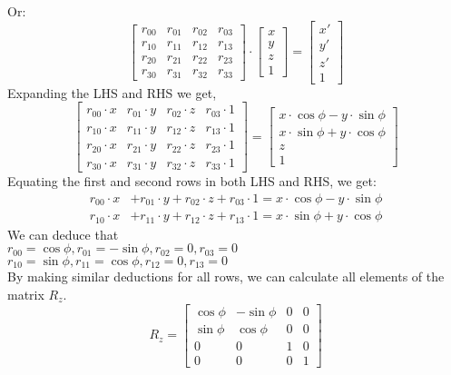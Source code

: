 Or:
\[
\begin{bmatrix}
r_{00} & r_{01} & r_{02} & r_{03} \\
r_{10} & r_{11} & r_{12} & r_{13} \\
r_{20} & r_{21} & r_{22} & r_{23} \\
r_{30} & r_{31} & r_{32} & r_{33}
\end{bmatrix}
\cdot
\begin{bmatrix}
x \\
y \\
z \\
1
\end{bmatrix}
=
\begin{bmatrix}
x' \\
y' \\
z'  \\
1
\end{bmatrix}
\]
Expanding the LHS and RHS we get,
\[
\begin{bmatrix}
r_{00} \cdot x & r_{01} \cdot y  & r_{02} \cdot z  & r_{03} \cdot 1 \\
r_{10} \cdot x  & r_{11} \cdot y  & r_{12} \cdot z  & r_{13} \cdot 1 \\
r_{20} \cdot x  & r_{21} \cdot y  & r_{22} \cdot z  & r_{23} \cdot 1 \\
r_{30} \cdot x  & r_{31} \cdot y  & r_{32} \cdot z  & r_{33}\cdot 1  
\end{bmatrix}
=
\begin{bmatrix}
 x \cdot \cos \phi - y \cdot \sin \phi \\
x \cdot \sin \phi + y \cdot \cos \phi \\
z  \\
1
\end{bmatrix}
\]
Equating the  first and second rows in both LHS and RHS, we get:
\begin{align*}
r_{00} \cdot x &+ r_{01} \cdot y + r_{02} \cdot z + r_{03} \cdot 1 = x \cdot \cos \phi - y \cdot \sin \phi \\
r_{10} \cdot x &+ r_{11} \cdot y + r_{12} \cdot z + r_{13} \cdot 1 = x \cdot \sin \phi + y \cdot \cos \phi
\end{align*}
We can deduce that \\ $r_{00} = \cos \phi, r_{01} = -\sin \phi,r_{02} = 0,r_{03} = 0$\\ $r_{10} = \sin \phi, r_{11} = \cos \phi, r_{12} = 0, r_{13} = 0$\\
By making similar deductions for all rows, we can calculate all elements of the matrix \(R_z\).
\begin{equation}
R_z =
\begin{bmatrix}
\cos \phi & -\sin \phi & 0 & 0 \\
\sin \phi & \cos \phi  & 0 & 0 \\
0         & 0          & 1 & 0 \\
0         & 0          & 0 & 1
\end{bmatrix}
\end{equation}

